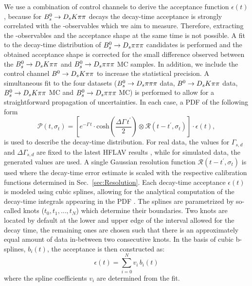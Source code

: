 We use a combination of control channels to derive the acceptance function $\epsilon(t)$, because for ${{B}^0_{s}}\rightarrow{\ensuremath{{D}_{s}}}{\ensuremath{K}}{\ensuremath{\pi}}{\ensuremath{\pi}}$ decays the decay-time acceptance is strongly correlated with the \CP-observables which we aim to measure. Therefore, extracting the \CP-observables and the acceptance shape at the same time is not possible. 
A fit to the decay-time distribution of ${{B}^0_{s}}\rightarrow{\ensuremath{{D}_{s}}}{\ensuremath{\pi}}{\ensuremath{\pi}}{\ensuremath{\pi}}$ candidates is performed and the obtained acceptance shape is corrected for the small difference 
observed between the ${{B}^0_{s}}\rightarrow{\ensuremath{{D}_{s}}}{\ensuremath{K}}{\ensuremath{\pi}}{\ensuremath{\pi}}$ and ${{B}^0_{s}}\rightarrow{\ensuremath{{D}_{s}}}{\ensuremath{\pi}}{\ensuremath{\pi}}{\ensuremath{\pi}}$ MC samples. 
In addition, we include the control channel ${{B}^0}\rightarrow{\ensuremath{{D}_{s}}}{\ensuremath{K}}{\ensuremath{\pi}}{\ensuremath{\pi}}$ to increase the statistical precision.
A simultaneous fit to the four datasets (${{B}^0_{s}}\rightarrow{\ensuremath{{D}_{s}}}{\ensuremath{\pi}}{\ensuremath{\pi}}{\ensuremath{\pi}}$ data, ${{B}^0}\rightarrow{\ensuremath{{D}_{s}}}{\ensuremath{K}}{\ensuremath{\pi}}{\ensuremath{\pi}}$ data, ${{B}^0_{s}}\rightarrow{\ensuremath{{D}_{s}}}{\ensuremath{K}}{\ensuremath{\pi}}{\ensuremath{\pi}}$ MC and ${{B}^0_{s}}\rightarrow{\ensuremath{{D}_{s}}}{\ensuremath{\pi}}{\ensuremath{\pi}}{\ensuremath{\pi}}$ MC)
is performed to allow for a straightforward propagation of uncertainties.
In each case, a PDF of the following form 
\begin{equation}
\mathcal{P}(t,\sigma_t) = \left[ e^{-\Gamma \, t}\cdot \text{cosh}\left(\frac{\Delta\Gamma \, t^\prime}{2}\right) \otimes \mathcal{R}(t - t^{'}, \sigma_t)\right] \cdot \epsilon(t),
\label{eq:AccPDF}
\end{equation}
is used to describe the decay-time distribution. 
For real data, the values for $\Gamma_{s,d}$ and $\Delta\Gamma_{s,d}$ are fixed to the latest HFLAV results \cite{HFAG},
while for simulated data, the generated values are used.
A  single Gaussian resolution function $\mathcal{R}(t - t^{'}, \sigma_t)$ is used where the decay-time error estimate is scaled with the respective calibration functions determined in
Sec.~\ref{sec:Resolution}.
Each decay-time acceptance $\epsilon(t)$ is modeled
using cubic splines, allowing for the analytical computation of the decay-time integrals appearing in the PDF \cite{Karbach:2014qba}.
The splines are parametrized by so-called knots ($t_0,t_1,\dots,t_N$) which determine their boundaries. 
Two knots are located by default at the lower and upper edge of the interval allowed for the decay time, the remaining ones are chosen 
such that there is an approximately equal amount of data in-between two consecutive knots.
In the basis of cubic b-splines, $b_i(t)$, the acceptance is then constructed as:
\begin{equation}   
	\epsilon(t) = \sum_{i=0}^N v_i \, b_i(t)   
	\label{eq:Spline}
\end{equation}
where the spline coefficients $v_i$ are determined from the fit.
